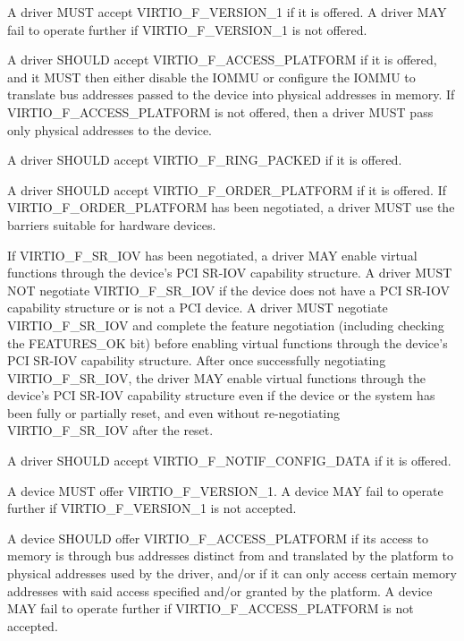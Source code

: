 
A driver MUST accept VIRTIO_F_VERSION_1 if it is offered.  A driver
MAY fail to operate further if VIRTIO_F_VERSION_1 is not offered.

A driver SHOULD accept VIRTIO_F_ACCESS_PLATFORM if it is offered, and it MUST
then either disable the IOMMU or configure the IOMMU to translate bus addresses
passed to the device into physical addresses in memory.  If
VIRTIO_F_ACCESS_PLATFORM is not offered, then a driver MUST pass only physical
addresses to the device.

A driver SHOULD accept VIRTIO_F_RING_PACKED if it is offered.

A driver SHOULD accept VIRTIO_F_ORDER_PLATFORM if it is offered.
If VIRTIO_F_ORDER_PLATFORM has been negotiated, a driver MUST use
the barriers suitable for hardware devices.

If VIRTIO_F_SR_IOV has been negotiated, a driver MAY enable
virtual functions through the device's PCI SR-IOV capability
structure.  A driver MUST NOT negotiate VIRTIO_F_SR_IOV if
the device does not have a PCI SR-IOV capability structure
or is not a PCI device.  A driver MUST negotiate
VIRTIO_F_SR_IOV and complete the feature negotiation
(including checking the FEATURES_OK 
bit) before enabling virtual functions through the device's
PCI SR-IOV capability structure.  After once successfully
negotiating VIRTIO_F_SR_IOV, the driver MAY enable virtual
functions through the device's PCI SR-IOV capability
structure even if the device or the system has been fully
or partially reset, and even without re-negotiating
VIRTIO_F_SR_IOV after the reset.

A driver SHOULD accept VIRTIO_F_NOTIF_CONFIG_DATA if it is offered.


A device MUST offer VIRTIO_F_VERSION_1.  A device MAY fail to operate further
if VIRTIO_F_VERSION_1 is not accepted.

A device SHOULD offer VIRTIO_F_ACCESS_PLATFORM if its access to
memory is through bus addresses distinct from and translated
by the platform to physical addresses used by the driver, and/or
if it can only access certain memory addresses with said access
specified and/or granted by the platform.
A device MAY fail to operate further if VIRTIO_F_ACCESS_PLATFORM is not
accepted.

